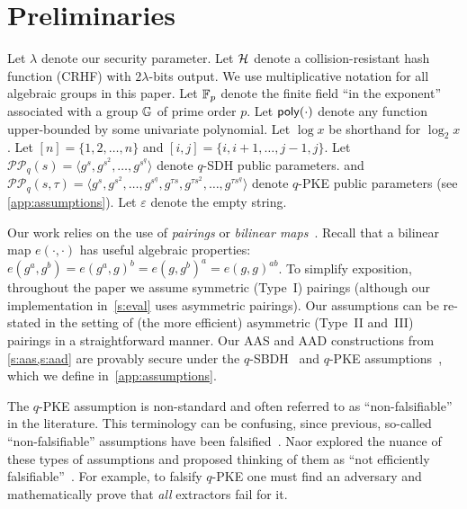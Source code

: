 \section{Preliminaries}
\label{s:prelim}

\label{s:prelim:notation}
Let $\lambda$ denote our security parameter.
Let $\mathcal{H}$ denote a collision-resistant hash function (CRHF) with $2\lambda$-bits output.
We use multiplicative notation for all algebraic groups in this paper.
Let $\mathbb{F}_p$ denote the finite field ``in the exponent'' associated with a group $\mathbb{G}$ of prime order $p$.
Let $\mathsf{poly}(\cdot)$ denote any function upper-bounded by some univariate polynomial.
Let $\log{x}$ be shorthand for $\log_2{x}$.
Let $[n] = \{1,2,\dots,n\}$ and $[i,j] = \{i,i+1,\dots,j-1,j\}$.
Let $\mathcal{PP}_q(s) = \langle g^s, g^{s^2}, \dots, g^{s^q}\rangle$ denote $q$-SDH public parameters.
and $\mathcal{PP}_q(s,\tau) = \langle g^s, g^{s^2}, \dots, g^{s^q}, g^{\tau s}, g^{\tau s^2}, \dots, g^{\tau s^q}\rangle$ denote $q$-PKE public parameters (see \cref{app:assumptions}).
Let $\varepsilon$ denote the empty string.

\label{s:prelim:cryptographic-assumptions}
Our work relies on the use of \emph{pairings} or \emph{bilinear maps}~\cite{mov-attack,pairing}.
Recall that a bilinear map $e(\cdot,\cdot)$ has useful algebraic properties: $e(g^a, g^b) = e(g^a, g)^b = e(g, g^b)^a = e(g, g)^{ab}$. 
To simplify exposition, throughout the paper we assume symmetric (Type~I) pairings (although our implementation in~\cref{s:eval} uses asymmetric pairings).
Our assumptions can be re-stated in the setting of (the more efficient) asymmetric (Type~II and~III) pairings in a straightforward manner. 
Our AAS and AAD constructions from \cref{s:aas,s:aad} are provably secure under the $q$-SBDH~\cite{qsbdh} and $q$-PKE assumptions~\cite{groth10}, which we define in~\cref{app:assumptions}.

The $q$-PKE assumption is non-standard and often referred to as ``non-falsifiable'' in the literature.
This terminology can be confusing, since previous, so-called ``non-falsifiable'' assumptions have been falsified~\cite{kea-falsified}.
Naor explored the nuance of these types of assumptions and proposed thinking of them as ``not efficiently falsifiable''~\cite{Naor2003OnCryptographic}.
For example, to falsify $q$-PKE one must find an adversary and mathematically prove that \textit{all} extractors fail for it.

